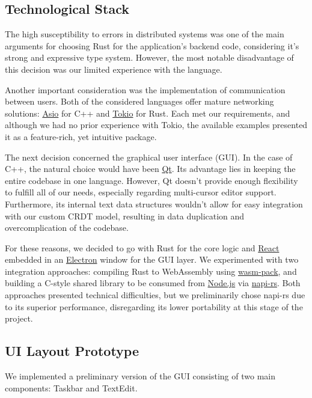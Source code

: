 \documentclass[12pt]{article}
\begin{document}
\subsection{Technological Stack}

The high susceptibility to errors in distributed systems was one of the main arguments for choosing 
Rust for the application's backend code, considering it's strong and expressive type system. However, 
the most notable disadvantage of this decision was our limited experience with the language.

Another important consideration was the implementation of communication between users. Both of the considered 
languages offer mature networking solutions: \href{https://think-async.com/Asio/}{Asio} for C++ and 
\href{https://tokio.rs/}{Tokio} for Rust. Each met our requirements, and although we had no prior experience 
with Tokio, the available examples presented it as a feature-rich, yet intuitive package.

The next decision concerned the graphical user interface (GUI). In the case of C++, the natural choice 
would have been \href{https://www.qt.io}{Qt}. Its advantage lies in keeping the entire codebase in one 
language. However, Qt doesn't provide enough flexibility to fulfill all of our needs, especially regarding 
multi-cursor editor support. Furthermore, its internal text data structures wouldn't allow for easy 
integration with our custom CRDT model, resulting in data duplication and overcomplication of the codebase.

For these reasons, we decided to go with Rust for the core logic and \href{https://react.dev}{React} 
embedded in an \href{https://www.electronjs.org}{Electron} window for the GUI layer. We experimented 
with two integration approaches: compiling Rust to WebAssembly using \href{https://github.com/drager/wasm-pack}{wasm-pack}, 
and building a C-style shared library to be consumed from \href{https://nodejs.org/en}{Node.js} via 
\href{https://napi.rs/}{napi-rs}. Both approaches presented technical difficulties, but we preliminarily 
chose napi-rs due to its superior performance, disregarding its lower portability at this stage of the 
project.

\subsection{UI Layout Prototype}

We implemented a preliminary version of the GUI consisting of two main components: Taskbar and TextEdit.
\end{document}
